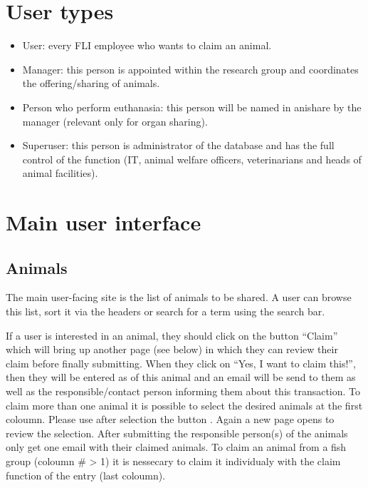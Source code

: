 \documentclass[letterpaper,10pt,openany,oneside,english]{sphinxmanual}
\begin{document}
\chapter{User types}
\label{\detokenize{index:user-types}}\begin{itemize}
\item {} 
User: every FLI employee who wants to claim an animal.

\item {} 
Manager: this person is appointed within the research group and coordinates the offering/sharing of animals.

\item {} 
Person who perform euthanasia: this person will be named in anishare by the manager (relevant only for organ sharing).

\item {} 
Superuser: this person is administrator of the database and has the full control of the function (IT, animal welfare officers, veterinarians and heads of animal facilities).

\end{itemize}


\chapter{Main user interface}
\label{\detokenize{index:main-user-interface}}

\section{Animals}
\label{\detokenize{index:animals}}
The main user-facing site is the list of animals to be shared. A user can browse this list, sort it
via the headers or search for a term using the search bar.

\noindent{}

If a user is interested in an animal, they should click on the button “Claim” which will bring up
another page (see below) in which they can review their claim before finally submitting. When they
click on “Yes, I want to claim this!”, then they will be entered as  of this animal and
an email will be send to them as well as the responsible/contact person informing them about this
transaction. To claim more than one animal it is possible to select the desired animals at the first coloumn.
Please use after selection the button . Again a new page opens to review the selection.
After submitting the responsible person(s) of the animals only get one email with their claimed animals.
To claim an animal from a fish group (coloumn \# \textgreater{} 1) it is nessecary to claim it individualy with the claim function of
the entry (last coloumn).
\end{document}
